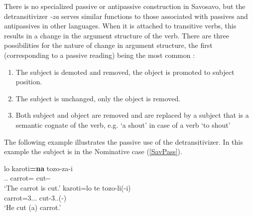 There is no specialized passive or antipassive construction in Savosavo, but the detransitivizer \emph{-za} serves similar functions to those associated with passives and antipassives in other languages. When it is attached to transitive verbs, this results in a change in the argument structure of the verb. 
There are three possibilities for the nature of change in argument structure, the first (corresponding to a passive reading) being the most common \citep[171]{Wegener:2008}:

\begin{enumerate}
\item The subject is demoted and removed, the object is promoted to subject position.
\item The subject is unchanged, only the object is removed.
\item Both subject and object are removed and are replaced by a subject that is a semantic
cognate of the verb, e.g. `a shout' in case of a verb `to shout'
\end{enumerate} 

The following example illustrates the passive use of the detransitivizer. 
In this example the subject is in the Nominative  case (\ref{SavPass}).

\begin{exe}\ex\label{SavPass}
\begin{xlist}
\ex\gll lo karoti\textbf{=na} tozo-za-i\\
\deter{}.\sg{}.\mas{} carrot=\nom{} cut-\detr{}-\fin{}\\
\glt`The carrot is cut.'
\ex\gll karoti=lo te tozo-li(-i)\\
carrot=3.\sg{}.\mas{}.\nom{} \emphat{} cut-3\sg{}.\mas{}.\obj{}(-\fin{})\\
\glt`He cut (a) carrot.'
\end{xlist}
\end{exe}


